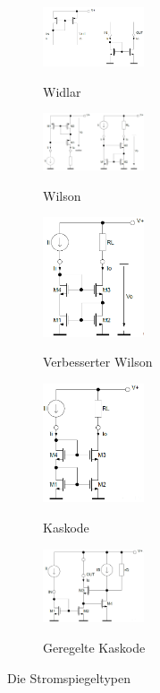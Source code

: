 \begin{figure}[h]
	\centering
	\begin{subfigure}[b]{3cm}
		\centering
		{\includegraphics[width=3cm]{images/stromspiegel/widlar.png}}
		\caption{Widlar}
	\end{subfigure} \qquad	
	\begin{subfigure}[b]{3cm}
		\centering
		{\includegraphics[width=3cm]{images/stromspiegel/wilson.png}}
		\caption{Wilson}
	\end{subfigure} \qquad	
	\begin{subfigure}[b]{3cm}
		\centering
		{\includegraphics[width=3cm]{images/stromspiegel/verbesserter_wilson.png}}
		\caption{Verbesserter Wilson}
	\end{subfigure} \qquad	
	\begin{subfigure}[b]{3cm}
		\centering
		{\includegraphics[width=3cm]{images/stromspiegel/kaskode.png}}
		\caption{Kaskode}
	\end{subfigure} \qquad	
	\begin{subfigure}[b]{3cm}
		\centering
		{\includegraphics[width=3cm]{images/stromspiegel/geregelte_kaskode.png}}
		\caption{Geregelte Kaskode}
	\end{subfigure} 
	
	

	\caption{Die Stromspiegeltypen}
\end{figure}
